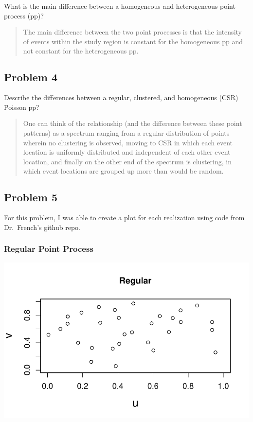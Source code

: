 \documentclass[
  letterpaper,
  DIV=11,
  numbers=noendperiod]{scrartcl}
\begin{document}
What is the main difference between a homogeneous and heterogeneous
point process (pp)?

\begin{quote}
The main difference between the two point processes is that the
intensity of events within the study region is constant for the
homogeneous pp and not constant for the heterogeneous pp.
\end{quote}

\hypertarget{problem-4}{%
\subsection{Problem 4}\label{problem-4}}

Describe the differences between a regular, clustered, and homogeneous
(CSR) Poisson pp?

\begin{quote}
One can think of the relationship (and the difference between these
point patterns) as a spectrum ranging from a regular distribution of
points wherein no clustering is observed, moving to CSR in which each
event location is uniformly distributed and independent of each other
event location, and finally on the other end of the spectrum is
clustering, in which event locations are grouped up more than would be
random.
\end{quote}

\hypertarget{problem-5}{%
\subsection{Problem 5}\label{problem-5}}

For this problem, I was able to create a plot for each realization using
code from Dr.~French's github repo.

\hypertarget{regular-point-process}{%
\subsubsection{Regular Point Process}\label{regular-point-process}}

\includegraphics{robby_homework1_files/figure-pdf/unnamed-chunk-2-1.pdf}
\end{document}

